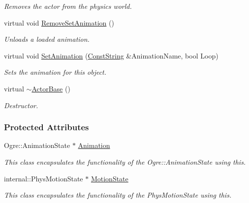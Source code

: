\begin{DoxyCompactItemize}
\begin{DoxyCompactList}\small\item\em Removes the actor from the physics world. \item\end{DoxyCompactList}\item 
virtual void \hyperlink{classMezzanine_1_1ActorBase_a148df02e486650cba1aa384faf85975f}{RemoveSetAnimation} ()
\begin{DoxyCompactList}\small\item\em Unloads a loaded animation. \item\end{DoxyCompactList}\item 
virtual void \hyperlink{classMezzanine_1_1ActorBase_af81c2b16a0a73608d9af4f9fb7e82ef4}{SetAnimation} (\hyperlink{namespaceMezzanine_a63cd699ac54b73953f35ec9cfc05e506}{ConstString} \&AnimationName, bool Loop)
\begin{DoxyCompactList}\small\item\em Sets the animation for this object. \item\end{DoxyCompactList}\item 
virtual \hyperlink{classMezzanine_1_1ActorBase_a0b49f2bc589504c908ccc47a635e1e79}{$\sim$ActorBase} ()
\begin{DoxyCompactList}\small\item\em Destructor. \item\end{DoxyCompactList}\end{DoxyCompactItemize}
\subsubsection*{Protected Attributes}
\begin{DoxyCompactItemize}
\item 
\hypertarget{classMezzanine_1_1ActorBase_ae71259b98aed5a9c269e0758344d36a7}{
Ogre::AnimationState $\ast$ \hyperlink{classMezzanine_1_1ActorBase_ae71259b98aed5a9c269e0758344d36a7}{Animation}}
\label{classMezzanine_1_1ActorBase_ae71259b98aed5a9c269e0758344d36a7}

\begin{DoxyCompactList}\small\item\em This class encapsulates the functionality of the Ogre::AnimationState using this. \item\end{DoxyCompactList}\item 
\hypertarget{classMezzanine_1_1ActorBase_a073d5307c4cb7a82f13133e8216f797b}{
internal::PhysMotionState $\ast$ \hyperlink{classMezzanine_1_1ActorBase_a073d5307c4cb7a82f13133e8216f797b}{MotionState}}
\label{classMezzanine_1_1ActorBase_a073d5307c4cb7a82f13133e8216f797b}

\begin{DoxyCompactList}\small\item\em This class encapsulates the functionality of the PhysMotionState using this. \item\end{DoxyCompactList}\end{DoxyCompactItemize}
